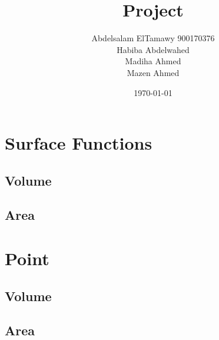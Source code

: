 \documentclass[]{article}
\author{Abdelsalam ElTamawy 900170376\\Habiba Abdelwahed\\Madiha Ahmed\\Mazen Ahmed}
\title{Project}
\date{\today}
\begin{document}
\begin{titlepage}
	\maketitle
	\tableofcontents
\end{titlepage}

	\section{Surface Functions}

	\subsection{Volume}

	\subsection{Area}

	\section{Point}

	\subsection{Volume}

	\subsection{Area}
\end{document}
